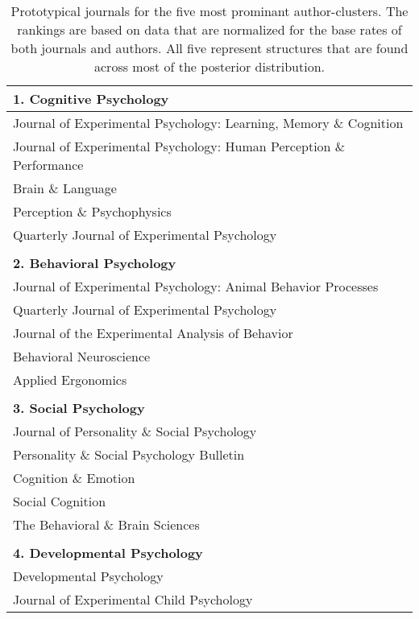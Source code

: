 \documentclass[authoryear]{elsarticle}
\newcommand{\tbsp}{\vspace*{-7pt}}
\begin{document}
\begin{table}[p]
        \begin{center}
        \caption{Prototypical journals for the five most prominant author-clusters.
        The rankings are based on data that are normalized for the base rates
        of both journals and authors. All five represent structures that are found
        across most of the posterior distribution.}
        \label{jnls} \footnotesize
        \begin{tabular}{l}
        \\ {\bf 1. Cognitive Psychology} \\ \hline
        Journal of Experimental Psychology: Learning, Memory \& Cognition \tbsp \\
        Journal of Experimental Psychology: Human Perception \& Performance \tbsp \\
        Brain \& Language  \tbsp \\
        Perception \& Psychophysics \tbsp \\
        Quarterly Journal of Experimental Psychology   \tbsp \\
        \\  {\bf 2. Behavioral Psychology} \\ \hline
        Journal of Experimental Psychology: Animal Behavior Processes  \tbsp  \\
        Quarterly Journal of Experimental Psychology\tbsp \\
        Journal of the Experimental Analysis of Behavior  \tbsp  \\
        Behavioral Neuroscience  \tbsp  \\
        Applied Ergonomics \tbsp \\
        \\  {\bf 3. Social Psychology} \\   \hline
        Journal of Personality \& Social Psychology   \tbsp  \\
        Personality \& Social Psychology Bulletin\tbsp  \\
        Cognition \& Emotion  \tbsp   \\
        Social Cognition \tbsp \\
        The Behavioral \& Brain Sciences  \tbsp   \\
        \\ {\bf 4. Developmental Psychology} \\ \hline
        Developmental Psychology    \tbsp \\
        Journal of Experimental Child Psychology  \tbsp  \\

\end{tabular}
\end{center}
\end{table}
\end{document}
